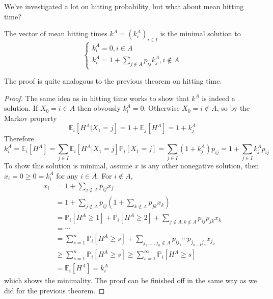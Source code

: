 We've investigated a lot on hitting probability, but what about mean hitting time?
\begin{theorem}
    The vector of mean hitting times $k^A=(k_i^A)_{i\in I}$ is the minimal solution to
    $$\begin{cases}
        k_i^A=0,i\in A\\
        k_i^A=1+\sum_{j\notin A}p_{ij}k_j^A,i\notin A
    \end{cases}$$
\end{theorem}
The proof is quite analogous to the previous theorem on hitting time.
\begin{proof}
    The same idea as in hitting time works to show that $k^A$ is indeed a solution.
    If $X_0=i\in A$ then obvously $k_i^A=0$.
    Otherwise $X_0=i\notin A$, so by the Markov property
    $$\mathbb E_i[H^A|X_1=j]=1+\mathbb E_j[H^A]=1+k_j^A$$
    Therefore
    $$k_i^A=\mathbb E_i[H^A]=\sum_{j\in I}\mathbb E_i[H^A|X_1=j]\mathbb P_i[X_1=j]=\sum_{j\in I}(1+k_j^A)p_{ij}=1+\sum_{j\in I}k_j^Ap_{ij}$$
    To show this solution is minimal, assume $x$ is any other nonegative solution, then $x_i=0\ge 0=k_i^A$ for any $i\in A$.
    For $i\notin A$,
    \begin{align*}
        x_i&=1+\sum_{j\notin A}p_{ij}x_j\\
        &=1+\sum_{j\notin A}p_{ij}\left( 1+\sum_{k\notin A}p_{jk}x_k \right)\\
        &=\mathbb P_i[H^A\ge 1]+\mathbb P_i[H^A\ge 2]+\sum_{j\notin A,k\notin A}p_{ij}p_{jk}x_k\\
        &=\cdots\\
        &=\sum_{s=1}^n\mathbb P_i[H^A\ge s]+\sum_{j_1,\ldots,j_n\notin A}p_{ij_1}\cdots p_{j_{n-1}j_n}x_{j_n}\\
        &\ge\sum_{s=1}^n\mathbb P_i[H^A\ge s]\ge\sum_{s=1}^\infty\mathbb P_i[H^A\ge s]\\
        &=\mathbb E_i[H^A]=k_i^A
    \end{align*}
    which shows the minimality.
    The proof can be finished off in the same way as we did for the previous theorem.
\end{proof}